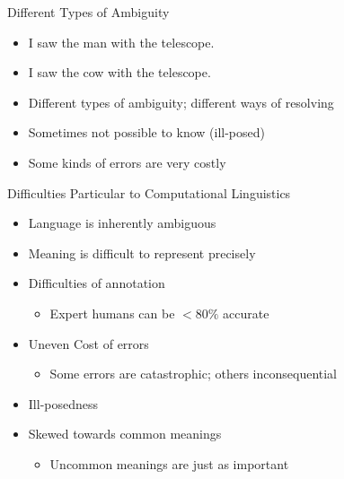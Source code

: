 \documentclass{beamer}
\begin{document}


\begin{frame}{Different Types of Ambiguity}

  \begin{itemize}
  \item I saw the man with the telescope.\\
    \hskip 0.2cm
    \hskip 0.2cm
    \hskip 0.2cm
    
  \item I saw the cow with the telescope.\\
    \hskip 0.2cm
  \item Different types of ambiguity; different ways of resolving
  \item Sometimes not possible to know \alert{(ill-posed)}
  \item Some kinds of errors are very costly
  \end{itemize}
  
\end{frame}

\begin{frame}{Difficulties Particular to Computational Linguistics}

  \begin{itemize}
  \item Language is inherently ambiguous
  \item Meaning is difficult to represent precisely
  \item Difficulties of annotation
    \begin{itemize}
    \item Expert humans can be $< 80\%$ accurate
    \end{itemize}
  \item Uneven Cost of errors
    \begin{itemize}
    \item Some errors are catastrophic; others inconsequential
    \end{itemize}
  \item Ill-posedness
  \item Skewed towards common meanings
    \begin{itemize}
    \item Uncommon meanings are just as important
    \end{itemize}
  \end{itemize}

\end{frame}
\end{document}
